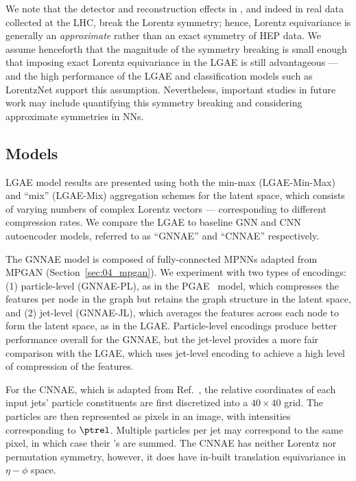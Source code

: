 We note that the detector and reconstruction effects in \jetnet, and indeed in real data collected at the LHC, break the Lorentz symmetry; hence, Lorentz equivariance is generally an \textit{approximate} rather than an exact symmetry of HEP data.
We assume henceforth that the magnitude of the symmetry breaking is small enough that imposing exact Lorentz equivariance in the LGAE is still advantageous --- and the high performance of the LGAE and classification models such as LorentzNet support this assumption.
Nevertheless, important studies in future work may include quantifying this symmetry breaking and considering approximate symmetries in NNs.

\subsection{Models}
\label{sec:06_lgae_models}

LGAE model results are presented using both the min-max (LGAE-Min-Max) and ``mix'' (LGAE-Mix) aggregation schemes for the latent space, which consists of varying numbers of complex Lorentz vectors --- corresponding to different compression rates.
We compare the LGAE to baseline GNN and CNN autoencoder models, referred to as ``GNNAE'' and ``CNNAE'' respectively.

The GNNAE model is composed of fully-connected MPNNs adapted from MPGAN (Section~\ref{sec:04_mpgan}).
We experiment with two types of encodings: (1) particle-level (GNNAE-PL), as in the PGAE~\cite{Tsan:2021brw} model, which compresses the features per node in the graph but retains the graph structure in the latent space, and (2) jet-level (GNNAE-JL), which averages the features across each node to form the latent space, as in the LGAE.
Particle-level encodings produce better performance overall for the GNNAE, but the jet-level provides a more fair comparison with the LGAE, which uses jet-level encoding to achieve a high level of compression of the features.

For the CNNAE, which is adapted from Ref.~\cite{Farina-anomaly}, the relative coordinates of each input jets' particle constituents are first discretized into a $40 \times 40$ grid.
The particles are then represented as pixels in an image, with intensities corresponding to $\ptrel$.
Multiple particles per jet may correspond to the same pixel, in which case their \ptrel's are summed.
The CNNAE has neither Lorentz nor permutation symmetry, however, it does have in-built translation equivariance in $\eta-\phi$ space.

